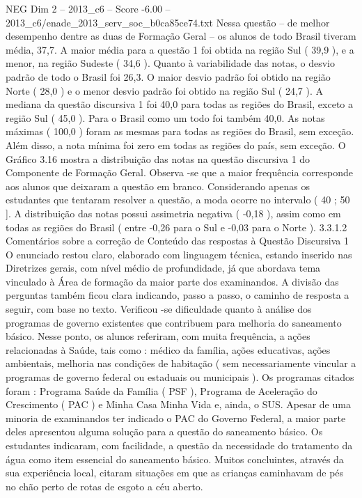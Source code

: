 \begin{textsample}{NEG Dim 2 – 2013\_c6 – Score -6.00 – 2013\_c6/enade\_2013\_serv\_soc\_b0ca85ce74.txt}
Nessa questão – de melhor desempenho dentre as duas de Formação Geral – os alunos de todo Brasil tiveram média, 37,7.
A maior média para a questão 1 foi obtida na região Sul ( 39,9 ), e a menor, na região Sudeste ( 34,6 ).
Quanto à variabilidade das notas, o desvio padrão de todo o Brasil foi 26,3.
O maior desvio padrão foi obtido na região Norte ( 28,0 ) e o menor desvio padrão foi obtido na região Sul ( 24,7 ).
A mediana da questão discursiva 1 foi 40,0 para todas as regiões do Brasil, exceto a região Sul ( 45,0 ).
Para o Brasil como um todo foi também 40,0.
As notas máximas ( 100,0 ) foram as mesmas para todas as regiões do Brasil, sem exceção.
Além disso, a nota mínima foi zero em todas as regiões do país, sem exceção.
O Gráfico 3.16 mostra a distribuição das notas na questão discursiva 1 do Componente de Formação Geral.
Observa -se que a maior frequência corresponde aos alunos que deixaram a questão em branco.
Considerando apenas os estudantes que tentaram resolver a questão, a moda ocorre no intervalo ( 40 ; 50 ].
A distribuição das notas possui assimetria negativa ( -0,18 ), assim como em todas as regiões do Brasil ( entre -0,26 para o Sul e -0,03 para o Norte ). 3.3.1.2 Comentários sobre a correção de Conteúdo das respostas à Questão Discursiva 1 O enunciado restou claro, elaborado com linguagem técnica, estando inserido nas Diretrizes gerais, com nível médio de profundidade, já que abordava tema vinculado à Área de formação da maior parte dos examinandos.
A divisão das perguntas também ficou clara indicando, passo a passo, o caminho de resposta a seguir, com base no texto.
Verificou -se dificuldade quanto à análise dos programas de governo existentes que contribuem para melhoria do saneamento básico.
Nesse ponto, os alunos referiram, com muita frequência, a ações relacionadas à Saúde, tais como : médico da família, ações educativas, ações ambientais, melhoria nas condições de habitação ( sem necessariamente vincular a programas de governo federal ou estaduais ou municipais ).
Os programas citados foram : Programa Saúde da Família ( PSF ), Programa de Aceleração do Crescimento ( PAC ) e Minha Casa Minha Vida e, ainda, o SUS.
Apesar de uma minoria de examinandos ter indicado o PAC do Governo Federal, a maior parte deles apresentou alguma solução para a questão do saneamento básico.
Os estudantes indicaram, com facilidade, a questão da necessidade do tratamento da água como item essencial do saneamento básico.
Muitos concluintes, através da sua experiência local, citaram situações em que as crianças caminhavam de pés no chão perto de rotas de esgoto a céu aberto.

\end{textsample}
